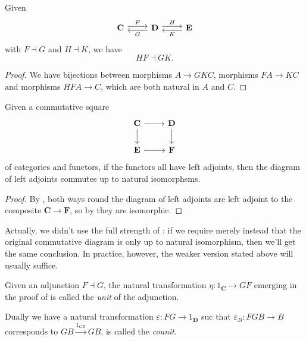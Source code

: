 \documentclass[a4paper]{article}
\renewcommand{\c}[1]{\mathbf{#1}}
\newcommand{\adjoint}{\dashv}
\begin{document}
\begin{lemma}
  \label{lem:composition of adjoints}
  Given
  \[
    \begin{tikzcd}
      \c C \ar[r, "F", shift left] & \c D \ar[l, "G", shift left] \ar[r, "H", shift left] & \c E \ar[l, "K", shift left]
    \end{tikzcd}
  \]
  with \(F \adjoint G\) and \(H \adjoint K\), we have
  \[
    HF \adjoint GK.
  \]
\end{lemma}

\begin{proof}
  We have bijections between morphisms \(A \to GKC\), morphisms \(FA \to KC\) and morphisms \(HFA \to C\), which are both natural in \(A\) and \(C\).
\end{proof}

\begin{corollary}
  Given a commutative square
  \[
    \begin{tikzcd}
      \c C \ar[r] \ar[d] & \c D \ar[d] \\
      \c E \ar[r] &\c F
    \end{tikzcd}
  \]
  of categories and functors, if the functors all have left adjoints, then the diagram of left adjoints commutes up to natural isomorphsms.
\end{corollary}

\begin{proof}
  By , both ways round the diagram of left adjoints are left adjoint to the composite \(\c C \to \c F\), so by  they are isomorphic.
\end{proof}

Actually, we didn't use the full strength of : if we require merely instead that the original commutative diagram is only up to natural isomorphism, then we'll get the same conclusion. In practice, however, the weaker version stated above will usually suffice.

\begin{definition}
  Given an adjunction \(F \adjoint G\), the natural transformation \(\eta: 1_{\c C} \to GF\) emerging in the proof of  is called the \emph{unit} of the adjunction.

  Dually we have a natural transformation \(\varepsilon: FG \to 1_{\c D}\) suc that \(\varepsilon_B: FGB \to B\) corresponds to \(GB \xrightarrow{1_{GB}} GB\), is called the \emph{counit}.
\end{definition}
\end{document}
